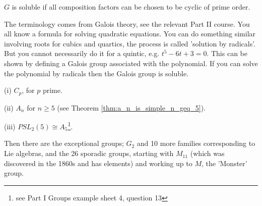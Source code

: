 \begin{definition}\label{def:soluble_group}
$G$ is soluble if all composition factors can be chosen to be cyclic of prime order.
\end{definition}

\begin{remark}
The terminology comes from Galois theory, see the relevant Part II course. You all know a formula for solving quadratic equations. You can do something similar involving roots for cubics and quartics, the process is called 'solution by radicals'. But you cannot necessarily do it for a quintic, e.g. $t^5 - 6t + 3 = 0$. This can be shown by defining a Galois group associated with the polynomial. If you can solve the polynomial by radicals then the Galois group is soluble.
\end{remark}







\begin{example}
\ben
\item [(i)] $C_p$, for $p$ prime.

\item [(ii)] $A_n$ for $n\geq 5$ (see Theorem \ref{thm:a_n_is_simple_n_geq_5}).


\item [(iii)] $PSL_2(5) \cong A_5$\footnote{see Part I Groups example sheet 4, question 13}.
\een

Then there are the exceptional groups; $G_2$ and 10 more families corresponding to Lie algebras, and the 26 sporadic groups, starting with $M_{11}$ (which was discovered in the 1860s and has elements) and working up to $M$, the 'Monster' group.
\end{example}



